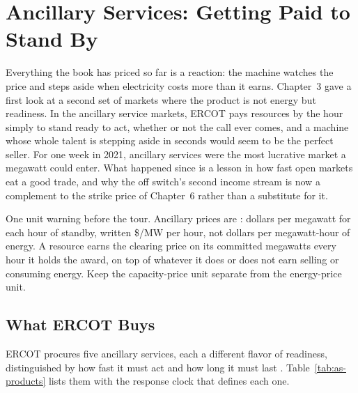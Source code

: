 \chapter{Ancillary Services: Getting Paid to Stand By}
\label{ch:ancillary}

Everything the book has priced so far is a reaction: the machine watches the price and steps aside when electricity costs more than it earns. Chapter~3 gave a first look at a second set of markets where the product is not energy but readiness. In the ancillary service markets, ERCOT pays resources by the hour simply to stand ready to act, whether or not the call ever comes, and a machine whose whole talent is stepping aside in seconds would seem to be the perfect seller. For one week in 2021, ancillary services were the most lucrative market a megawatt could enter. What happened since is a lesson in how fast open markets eat a good trade, and why the off switch's second income stream is now a complement to the strike price of Chapter~6 rather than a substitute for it.

One unit warning before the tour. Ancillary prices are : dollars per megawatt for each hour of standby, written \$/MW per hour, not dollars per megawatt-hour of energy. A resource earns the clearing price on its committed megawatts every hour it holds the award, on top of whatever it does or does not earn selling or consuming energy. Keep the capacity-price unit separate from the energy-price unit. %

\section{What ERCOT Buys}

ERCOT procures five ancillary services, each a different flavor of readiness, distinguished by how fast it must act and how long it must last \autocite{ercot2026protocols}. %
Table~\ref{tab:as-products} lists them with the response clock that defines each one.

